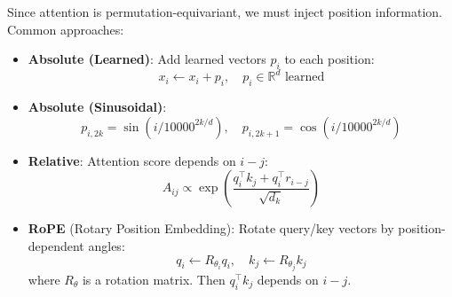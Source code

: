\begin{definition}
    Since attention is permutation-equivariant, we must inject position information. Common approaches:

    \begin{itemize}
        \item \textbf{Absolute (Learned)}: Add learned vectors $p_i$ to each position:
        \[
            x_i \leftarrow x_i + p_i, \quad p_i \in \mathbb{R}^d \text{ learned}
        \]

        \item \textbf{Absolute (Sinusoidal)}:
        \[
            p_{i,2k} = \sin(i / 10000^{2k/d}), \quad p_{i,2k+1} = \cos(i / 10000^{2k/d})
        \]

        \item \textbf{Relative}: Attention score depends on $i - j$:
        \[
            A_{ij} \propto \exp\left(\frac{q_i^\top k_j + q_i^\top r_{i-j}}{\sqrt{d_k}}\right)
        \]

        \item \textbf{RoPE} (Rotary Position Embedding): Rotate query/key vectors by position-dependent angles:
        \[
            q_i \leftarrow R_{\theta_i} q_i, \quad k_j \leftarrow R_{\theta_j} k_j
        \]
        where $R_\theta$ is a rotation matrix. Then $q_i^\top k_j$ depends on $i - j$.
    \end{itemize}
\end{definition}

